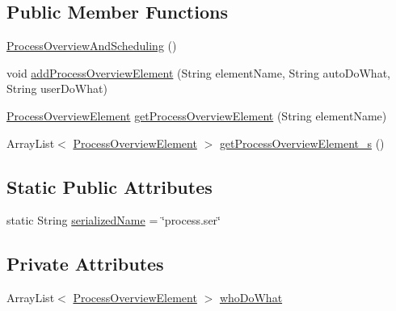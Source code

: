 \subsection*{Public Member Functions}
\begin{DoxyCompactItemize}
\item 
\hyperlink{classit_1_1isislab_1_1masonhelperdocumentation_1_1_o_d_d_1_1_process_overview_and_scheduling_a082a6cd7cc78f78d0f7fad3b70abd468}{Process\-Overview\-And\-Scheduling} ()
\item 
void \hyperlink{classit_1_1isislab_1_1masonhelperdocumentation_1_1_o_d_d_1_1_process_overview_and_scheduling_a37cb5ebe1a6f66352878173a67b8056f}{add\-Process\-Overview\-Element} (String element\-Name, String auto\-Do\-What, String user\-Do\-What)
\item 
\hyperlink{classit_1_1isislab_1_1masonhelperdocumentation_1_1_o_d_d_1_1_process_overview_element}{Process\-Overview\-Element} \hyperlink{classit_1_1isislab_1_1masonhelperdocumentation_1_1_o_d_d_1_1_process_overview_and_scheduling_a9084b96891933dd08c76d42e2827e39c}{get\-Process\-Overview\-Element} (String element\-Name)
\item 
Array\-List$<$ \hyperlink{classit_1_1isislab_1_1masonhelperdocumentation_1_1_o_d_d_1_1_process_overview_element}{Process\-Overview\-Element} $>$ \hyperlink{classit_1_1isislab_1_1masonhelperdocumentation_1_1_o_d_d_1_1_process_overview_and_scheduling_a61a97f4c5aaa22706619f06cd62155b7}{get\-Process\-Overview\-Element\-\_\-s} ()
\end{DoxyCompactItemize}
\subsection*{Static Public Attributes}
\begin{DoxyCompactItemize}
\item 
static String \hyperlink{classit_1_1isislab_1_1masonhelperdocumentation_1_1_o_d_d_1_1_process_overview_and_scheduling_ae9fbdf58650557068942b5247ea74065}{serialized\-Name} = \char`\"{}process.\-ser\char`\"{}
\end{DoxyCompactItemize}
\subsection*{Private Attributes}
\begin{DoxyCompactItemize}
\item 
Array\-List$<$ \hyperlink{classit_1_1isislab_1_1masonhelperdocumentation_1_1_o_d_d_1_1_process_overview_element}{Process\-Overview\-Element} $>$ \hyperlink{classit_1_1isislab_1_1masonhelperdocumentation_1_1_o_d_d_1_1_process_overview_and_scheduling_a19435fe761c50ba80b9a5ca705102e21}{who\-Do\-What}
\end{DoxyCompactItemize}

